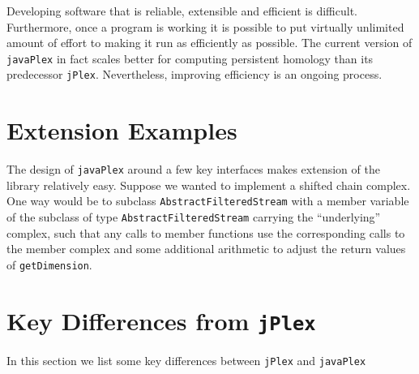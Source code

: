 \documentclass[11pt]{amsart}
\newcommand\jPlex{\texttt{jPlex}\xspace}
\newcommand\javaPlex{\texttt{javaPlex}\xspace}
\begin{document}
Developing software that is reliable, extensible and efficient is difficult. Furthermore, once a program is working it is possible to put virtually unlimited amount of effort to making it run as efficiently as possible. The current version of \javaPlex in fact scales better for computing persistent homology than its predecessor \jPlex. Nevertheless, improving efficiency is an ongoing process.

\section{Extension Examples}

The design of \javaPlex around a few key interfaces makes extension of the library relatively easy. Suppose we wanted to implement a shifted chain complex. One way would be to subclass \texttt{Abstract\-Filtered\-Stream} with a member variable of the subclass of type \texttt{Abstract\-Filtered\-Stream} carrying the ``underlying'' complex, such that any calls to member functions use the corresponding calls to the member complex and some additional arithmetic to adjust the return values of \texttt{getDimension}.


\section{Key Differences from \jPlex}

In this section we list some key differences between \jPlex and \javaPlex
\end{document}
